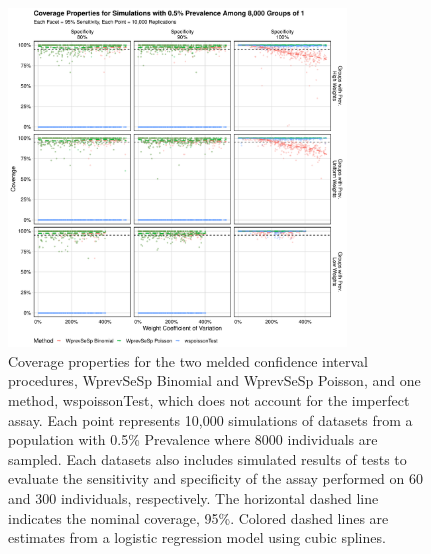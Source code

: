 \documentclass[AMA,STIX1COL]{WileyNJD-v2}
\begin{document}
\begin{figure}
\centering
\includegraphics[width=0.8\textwidth]{figures/imperfect_coverage_8000_groups_0_005_prev.pdf}
\caption{Coverage properties for the two melded confidence interval procedures, WprevSeSp Binomial and WprevSeSp Poisson, and one method, wspoissonTest, which does not account for the imperfect assay.
Each point represents 10,000 simulations of datasets from a population with 0.5\% Prevalence where 8000 individuals are sampled.
Each datasets also includes simulated results of tests to evaluate the sensitivity and specificity of the assay performed on 60 and 300 individuals, respectively.
The horizontal dashed line indicates the nominal coverage, 95\%.
Colored dashed lines are estimates from a logistic regression model using cubic splines.}
\label{fig:imperfect_coverage_8000_groups_0_005_prev}
\end{figure}
\end{document}
